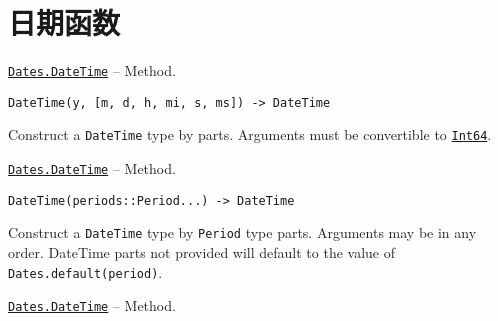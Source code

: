 \hypertarget{9236894787070694841}{}


\section{日期函数}


\hypertarget{1328456258006961178}{} 
\hyperlink{1328456258006961178}{\texttt{Dates.DateTime}}  -- {Method.}

\begin{adjustwidth}{2em}{0pt}


\begin{verbatim}
DateTime(y, [m, d, h, mi, s, ms]) -> DateTime
\end{verbatim}

Construct a \texttt{DateTime} type by parts. Arguments must be convertible to \hyperlink{7720564657383125058}{\texttt{Int64}}.



\end{adjustwidth}
\hypertarget{8234829693150521940}{} 
\hyperlink{8234829693150521940}{\texttt{Dates.DateTime}}  -- {Method.}

\begin{adjustwidth}{2em}{0pt}


\begin{verbatim}
DateTime(periods::Period...) -> DateTime
\end{verbatim}

Construct a \texttt{DateTime} type by \texttt{Period} type parts. Arguments may be in any order. DateTime parts not provided will default to the value of \texttt{Dates.default(period)}.



\end{adjustwidth}
\hypertarget{18390475731552157559}{} 
\hyperlink{18390475731552157559}{\texttt{Dates.DateTime}}  -- {Method.}

